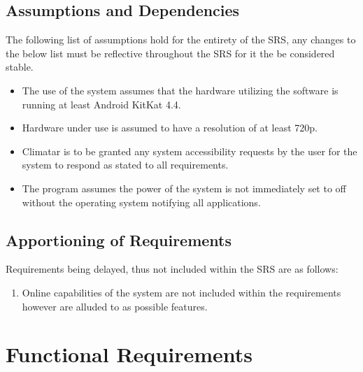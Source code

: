 \documentclass[]{article}
\begin{document}
\subsection{Assumptions and Dependencies}
\label{sub:assumptions_and_dependencies}
The following list of assumptions hold for the entirety of the SRS, any changes to the below list must be reflective throughout the SRS for it the be considered stable.
\begin{itemize}
	\item The use of the system assumes that the hardware utilizing the software is running at least Android KitKat 4.4.
	\item Hardware under use is assumed to have a resolution of at least 720p.
	\item Climatar is to be granted any system accessibility requests by the user for the system to respond as stated to all requirements.
	\item The program assumes the power of the system is not immediately set to off without the operating system notifying all applications.
\end{itemize}

\subsection{Apportioning of Requirements}
\label{sub:apportioning_of_requirements}
Requirements being delayed, thus not included within the SRS are as follows:
\begin{enumerate}
	\item Online capabilities of the system are not included within the requirements however are alluded to as possible features.
\end{enumerate}



\section{Functional Requirements}
\label{sec:functional_requirements}
\end{document}
